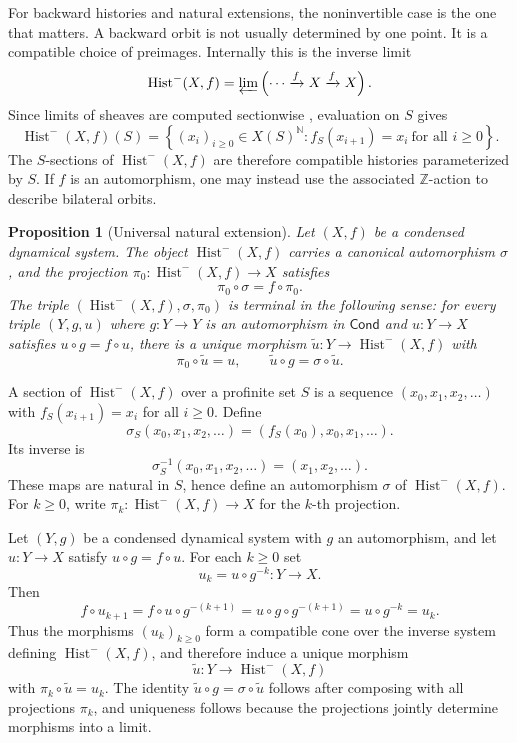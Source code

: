 \documentclass[10pt]{amsart}
\makeatletter
\newcommand{\Cond}{\mathsf{Cond}}
\newcommand{\Hist}{\operatorname{Hist}}
\newcommand{\Z}{\mathbb{Z}}
\newcommand{\N}{\mathbb{N}}
\theoremstyle{plain}
\newtheorem{proposition}[theorem]{Proposition}
\theoremstyle{definition}
\renewenvironment{proof}[1][\proofname]{\par
  \pushQED{\qed}%
  \normalfont \topsep6\p@\@plus6\p@\relax
  \trivlist
  \item[\hskip\labelsep\itshape #1\@addpunct{:}]\ignorespaces
}{%
  \popQED\endtrivlist\@endpefalse
}
\makeatother
\begin{document}
For backward histories and natural extensions, the noninvertible case is the
one that matters. A backward orbit is not usually determined by one point. It
is a compatible choice of preimages. Internally this is the inverse limit
\[
  \Hist^{-}(X,f)
  =
  \varprojlim
  \left(
  \cdots \xrightarrow{f} X \xrightarrow{f} X
  \right).
\]
Since limits of sheaves are computed sectionwise
\cite{MacLaneMoerdijk,JohnstoneTopos}, evaluation on $S$ gives
\[
  \Hist^{-}(X,f)(S)
  =
  \left\{
  (x_i)_{i\ge0}\in X(S)^{\N}:
  f_S(x_{i+1})=x_i\ \text{for all }i\ge0
  \right\}.
\]
The $S$-sections of $\Hist^{-}(X,f)$ are therefore compatible histories
parameterized by $S$. If $f$ is an automorphism, one may instead use the
associated $\Z$-action to describe bilateral orbits.

\begin{proposition}[Universal natural extension]
\label{prop:history-universal}
Let $(X,f)$ be a condensed dynamical system. The object
$\Hist^{-}(X,f)$ carries a canonical automorphism $\sigma$, and the projection
$\pi_0:\Hist^{-}(X,f)\to X$ satisfies
\[
  \pi_0\circ \sigma=f\circ \pi_0.
\]
The triple $(\Hist^{-}(X,f),\sigma,\pi_0)$ is terminal in the following sense:
for every triple $(Y,g,u)$ where $g:Y\to Y$ is an automorphism in $\Cond$ and
$u:Y\to X$ satisfies $u\circ g=f\circ u$, there is a unique morphism
$\widetilde u:Y\to\Hist^{-}(X,f)$ with
\[
  \pi_0\circ\widetilde u=u,
  \qquad
  \widetilde u\circ g=\sigma\circ\widetilde u.
\]
\end{proposition}

\begin{proof}
A section of $\Hist^{-}(X,f)$ over a profinite set $S$ is a sequence
$(x_0,x_1,x_2,\ldots)$ with $f_S(x_{i+1})=x_i$ for all $i\ge0$. Define
\[
  \sigma_S(x_0,x_1,x_2,\ldots)=(f_S(x_0),x_0,x_1,\ldots).
\]
Its inverse is
\[
  \sigma_S^{-1}(x_0,x_1,x_2,\ldots)=(x_1,x_2,\ldots).
\]
These maps are natural in $S$, hence define an automorphism $\sigma$ of
$\Hist^{-}(X,f)$.
For $k\ge0$, write $\pi_k:\Hist^{-}(X,f)\to X$ for the $k$-th projection.

Let $(Y,g)$ be a condensed dynamical system with $g$ an automorphism, and let
$u:Y\to X$ satisfy $u\circ g=f\circ u$. For each $k\ge0$ set
\[
  u_k=u\circ g^{-k}:Y\to X.
\]
Then
\[
  f\circ u_{k+1}
  =f\circ u\circ g^{-(k+1)}
  =u\circ g\circ g^{-(k+1)}
  =u\circ g^{-k}
  =u_k.
\]
Thus the morphisms $(u_k)_{k\ge0}$ form a compatible cone over the inverse
system defining $\Hist^{-}(X,f)$, and therefore induce a unique morphism
\[
  \widetilde u:Y\to\Hist^{-}(X,f)
\]
with $\pi_k\circ \widetilde u=u_k$. The identity
$\widetilde u\circ g=\sigma\circ\widetilde u$ follows after composing with all
projections $\pi_k$, and uniqueness follows because the projections jointly
determine morphisms into a limit.
\end{proof}
\end{document}
